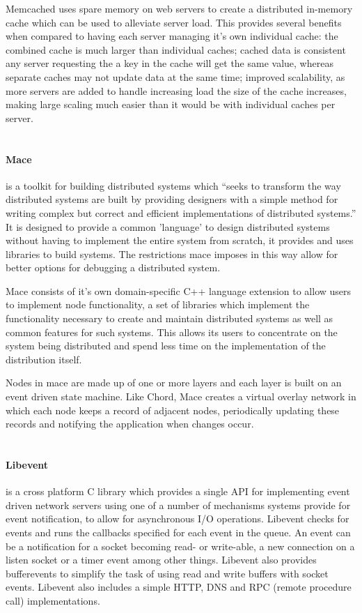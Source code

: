 \documentclass{article}
\begin{document}
Memcached uses spare memory on web servers to create a distributed in-memory cache which can be used to alleviate server load. This provides several benefits when compared to having each server managing it's own individual cache: the combined cache is much larger than individual caches; cached data is consistent any server requesting the a key in the cache will get the same value, whereas separate caches may not update data at the same time; improved scalability, as more servers are added to handle increasing load the size of the cache increases, making large scaling much easier than it would be with individual caches per server.
\\
\\
\paragraph{Mace} \cite{mace} is a toolkit for building distributed systems which “seeks to transform the way distributed systems are built by providing designers with a simple method for writing complex but correct and efficient implementations of distributed systems.” \cite{mace_quote} It is designed to provide a common 'language' to design distributed systems without having to implement the entire system from scratch, it provides and uses libraries to build systems. The restrictions mace imposes in this way allow for better options for debugging a distributed system.

Mace consists of it's own domain-specific C++ language extension to allow users to implement node functionality, a set of libraries which implement the functionality necessary to create and maintain distributed systems as well as common features for such systems. This allows its users to concentrate on the system being distributed and spend less time on the implementation of the distribution itself.

Nodes in mace are made up of one or more layers and each layer is built on an event driven state machine. Like Chord, Mace creates a virtual overlay network in which each node keeps a record of adjacent nodes, periodically updating these records and notifying the application when changes occur.
\\
\\
\paragraph{Libevent} \cite{libevent} is a cross platform C library which provides a single API for implementing event driven network servers using one of a number of mechanisms systems provide for event notification, to allow for asynchronous I/O operations. Libevent checks for events and runs the callbacks specified for each event in the queue. An event can be a notification for a socket becoming read- or write-able, a new connection on a listen socket or a timer event among other things. Libevent also provides bufferevents to simplify the task of using read and write buffers with socket events. Libevent also includes a simple HTTP, DNS and RPC (remote procedure call) implementations.
\\
\\
\end{document}
